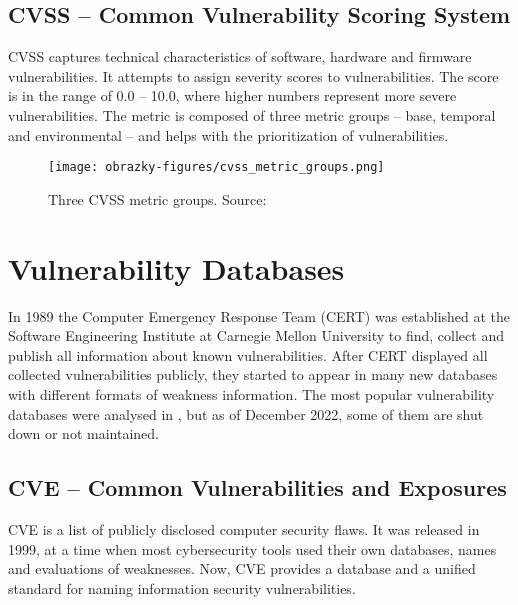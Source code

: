   \subsection*{CVSS -- Common Vulnerability Scoring System}
  CVSS captures technical characteristics of software, hardware and firmware vulnerabilities. It attempts
  to assign severity scores to vulnerabilities. The score is in the range of 0.0 -- 10.0, where higher numbers represent
  more severe vulnerabilities. The metric is composed of three metric groups -- base, temporal and environmental --
  and helps with the prioritization of vulnerabilities. \cite{CVSSFirst, CVSSresearchgate}

  \begin{figure}[h]
    \centering
    \texttt{[image: obrazky-figures/cvss\_metric\_groups.png]}
    \caption{Three CVSS metric groups. Source: \cite{CVSSFirst}}
  \end{figure}


  \section{Vulnerability Databases}
  In 1989 the Computer Emergency Response Team (CERT) was established at the Software Engineering Institute
  at Carnegie Mellon University to find, collect and publish all information about known vulnerabilities.
  After CERT displayed all collected vulnerabilities publicly, they started to appear in many new databases
  with different formats of weakness information. The most popular vulnerability databases were analysed
  in \cite{VulnDBs}, but as of December 2022, some of them are shut down or not maintained.

  \subsection*{CVE -- Common Vulnerabilities and Exposures}
    CVE is a list of publicly disclosed computer security flaws. It was released in 1999, at a time when
    most cybersecurity tools used their own databases, names and evaluations of weaknesses. Now, CVE provides
    a database and a unified standard for naming information security vulnerabilities.

